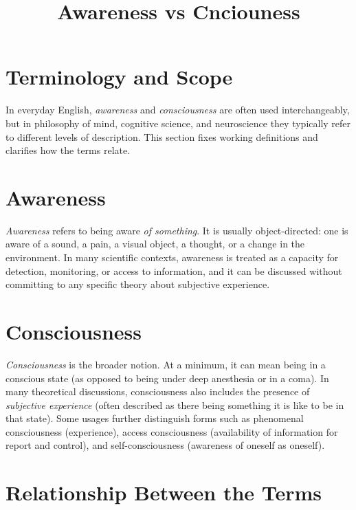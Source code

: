 \documentclass[a4paper]{article}
\title{Awareness vs Cnciouness}
\date{}
\begin{document}
    \maketitle
    
    
    \section{Terminology and Scope}
        
        In everyday English, \emph{awareness} and \emph{consciousness} are often used interchangeably, but in philosophy of mind, cognitive science, and neuroscience they typically refer to different levels of description. This section fixes working definitions and clarifies how the terms relate.
    
    
    \section{Awareness}
        
        \emph{Awareness} refers to being aware \emph{of something}. It is usually object-directed: one is aware of a sound, a pain, a visual object, a thought, or a change in the environment. In many scientific contexts, awareness is treated as a capacity for detection, monitoring, or access to information, and it can be discussed without committing to any specific theory about subjective experience.
    
    
    \section{Consciousness}
        
        \emph{Consciousness} is the broader notion. At a minimum, it can mean being in a conscious state (as opposed to being under deep anesthesia or in a coma). In many theoretical discussions, consciousness also includes the presence of \emph{subjective experience} (often described as there being something it is like to be in that state). Some usages further distinguish forms such as phenomenal consciousness (experience), access consciousness (availability of information for report and control), and self-consciousness (awareness of oneself as oneself).
    
    
    \section{Relationship Between the Terms}
        
\end{document}
